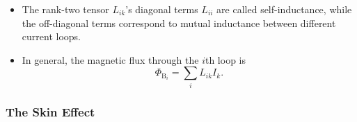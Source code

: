 \documentclass[11pt, a4paper]{article}
\begin{document}
\begin{itemize}
\begin{itemize}
        \item The rank-two tensor $ L_{ik} $'s diagonal terms $ L_{ii} $ are called self-inductance, while the off-diagonal terms correspond to mutual inductance between different current loops.

        \item In general, the magnetic flux through the $ i $th loop is
        \begin{equation*}
            \Phi_{\text{B}_{i}} = \sum_{i} L_{ik}I_{k}.
        \end{equation*}
    \end{itemize}
    
	
	

\end{itemize}

\subsubsection{The Skin Effect}
\end{document}

